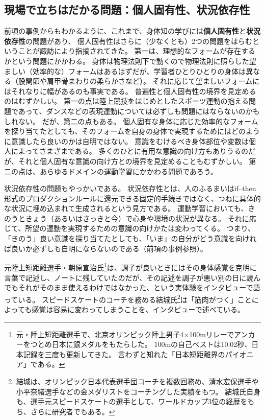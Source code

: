 \subsection{現場で立ちはだかる問題：個人固有性、状況依存性}
\label{subsec:kojinkoyu_and_jokyoizon}
前項の事例からもわかるように、これまで、身体知の学びには\textbf{個人固有性}\cite{suwa:2016}と\textbf{状況依存性}\cite{clancey:1997}の問題があり、
個人固有性はさらに（少なくとも）2つの問題をはらむということが諏訪\cite{suwa:2016}により指摘されてきた。
第一は、理想的なフォームが存在するかという問題にかかわる。
身体は物理法則下で動くので物理法則に照らした望ましい（効率的な）フォームはあるはずだが、学習者ひとりひとりの身体は異なる（股関節や肩甲骨まわりの柔らかさなど）。
それに応じて望ましいフォームにはそれなりに幅があるのも事実である。
普遍性と個人固有性の境界を見定めるのはむずかしい。
第一の点は陸上競技をはじめとしたスポーツ運動の抱える問題であって、ダンスなどの表現運動については必ずしも問題にはならないのかもしれない。
だが、第二の点もある。
個人固有な身体に応じた効率的なフォームを探り当てたとしても、そのフォームを自身の身体で実現するためにはどのように意識したら良いのかは自明ではない。
意識をむけるべき身体部位や変数は個人によってさまざまである。
多くのひとに有用な意識の向け方もありうるのだが、それと個人固有な意識の向け方との境界を見定めることもむずかしい。
第二の点は、あらゆるドメインの運動学習にかかわる問題であろう。

状況依存性の問題\cite{clancey:1997}もやっかいである。
状況依存性とは、人のふるまいはif–then形式のプロダクションルールに還元できる固定的手続きではなく、つねに具体的な状況に埋め込まれて生成されるという見方である。
運動学習においても、きのうときょう（あるいはさっきと今）で心身や環境の状況が異なる。
それに応じて、所望の運動を実現するための意識の向けかたは変わってくる。
つまり、「きのう」良い意識を探り当てたとしても、「いま」の自分がどう意識を向ければ良いか必ずしも自明にならないのである（前項の事例参照）。

元陸上短距離選手・朝原宣治氏\footnote{
  元・陸上短距離選手で、北京オリンピック陸上男子4×100mリレーでアンカーをつとめ日本に銀メダルをもたらした。
  100mの自己ベストは10.02秒、日本記録を三度も更新してきた。
  言わずと知れた「日本短距離界のパイオニア」である。
}は、調子が良いときにはその身体感覚を克明に言葉で記述し、ノートに残していたのだが、その記述を調子が悪い別の日に読んでもそれがそのまま使えるわけではなかった、という実体験をインタビューで語っている\cite{ikuta:2011}。
スピードスケートのコーチを務める結城氏\footnote{
  結城は、オリンピック日本代表選手団コーチを複数回務め、清水宏保選手や小平奈緒選手などの金メダリストをコーチングした実績をもつ。
  結城氏自身も、選手元スピードスケートの選手として、ワールドカップ3位の経歴をもち、さらに研究者でもある。
}は「筋肉がつく」ことによっても感覚は容易に変わってしまう\cite{ikuta:2011}ことを、インタビューで述べている。

